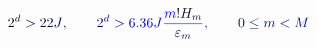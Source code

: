 \documentclass[12pt]{article}
\begin{document}
\makeatletter
\renewcommand*{\@textcolor}[3]{%
  \protect\leavevmode
  \begingroup
    \color#1{#2}#3%
  \endgroup
}
\makeatother
\begin{displaymath}
\mathcolor[RGB]{0,0,15}{2} ^ { \mathcolor[RGB]{0,0,30}{d} } \mathcolor[RGB]{0,0,45}{>} \mathcolor[RGB]{0,0,60}{2} \mathcolor[RGB]{0,0,75}{2} \mathcolor[RGB]{0,0,90}{J} \mathcolor[RGB]{0,0,105}{,} \qquad \mathcolor[RGB]{0,0,120}{2} ^ { \mathcolor[RGB]{0,0,135}{d} } \mathcolor[RGB]{0,0,150}{>} \mathcolor[RGB]{0,0,165}{6} \mathcolor[RGB]{0,0,180}{.} \mathcolor[RGB]{0,0,195}{3} \mathcolor[RGB]{0,0,210}{6} \mathcolor[RGB]{0,0,225}{J} \mathcolor[RGB]{0,0,240}{\frac { \mathcolor[RGB]{0,0,255}{m} \mathcolor[RGB]{0,15,0}{!} \mathcolor[RGB]{0,15,15}{H} _ { \mathcolor[RGB]{0,15,30}{m} } } { \mathcolor[RGB]{0,15,45}{\varepsilon} _ { \mathcolor[RGB]{0,15,60}{m} } } } \mathcolor[RGB]{0,15,75}{,} \qquad \mathcolor[RGB]{0,15,90}{0} \mathcolor[RGB]{0,15,105}{\leq} \mathcolor[RGB]{0,15,120}{m} \mathcolor[RGB]{0,15,135}{<} \mathcolor[RGB]{0,15,150}{M}
\end{displaymath}
\end{document}
